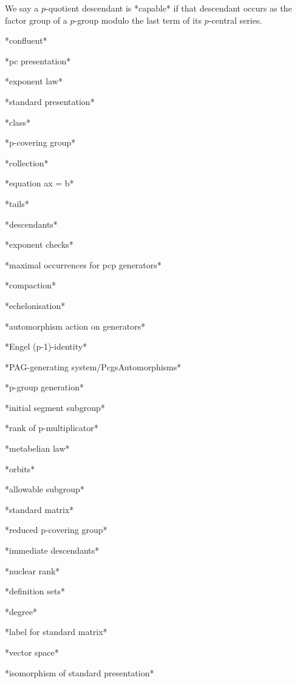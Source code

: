 

We say a $p$-quotient descendant is *capable* if that  descendant  occurs
as the  factor  group  of  a  $p$-group  modulo  the  last  term  of  its
$p$-central series.

*confluent*

*pc presentation*

*exponent law*

*standard presentation*

*class*

*p-covering group*

*collection*

*equation ax = b*

*tails*

*descendants*

*exponent checks*

*maximal occurrences for pcp generators*

*compaction*

*echelonisation*

*automorphism action on generators*

*Engel (p-1)-identity*

*PAG-generating system/PcgsAutomorphisms*

*p-group generation*

*initial segment subgroup*

*rank of p-multiplicator*

*metabelian law*

*orbits*

*allowable subgroup*

*standard matrix*

*reduced p-covering group*

*immediate descendants*

*nuclear rank*

*definition sets*

*degree*

*label for standard matrix*

*vector space*

*isomorphism of standard presentation*

